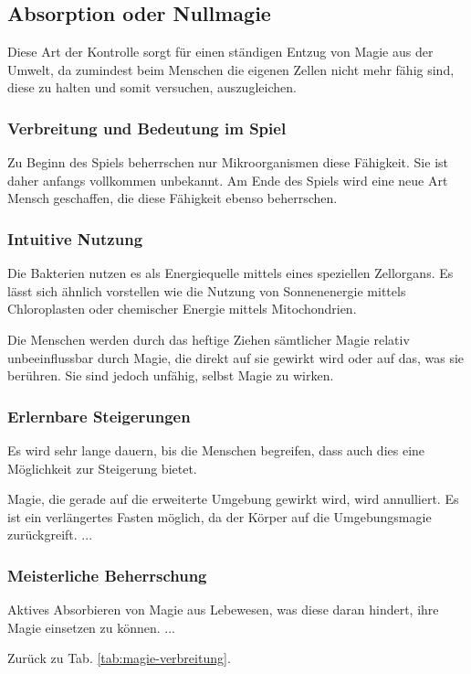 \subsection{Absorption oder Nullmagie}\label{sec:nullmagie}
Diese Art der Kontrolle sorgt für einen ständigen Entzug von Magie aus der Umwelt, da zumindest beim Menschen die eigenen Zellen nicht mehr fähig sind, diese zu halten und somit versuchen, auszugleichen. 

\subsubsection{Verbreitung und Bedeutung im Spiel}
Zu Beginn des Spiels beherrschen nur Mikroorganismen diese Fähigkeit. Sie ist daher anfangs vollkommen unbekannt. 
Am Ende des Spiels wird eine neue Art Mensch geschaffen, die diese Fähigkeit ebenso beherrschen.

\subsubsection{Intuitive Nutzung}
Die Bakterien nutzen es als Energiequelle mittels eines speziellen Zellorgans. 
Es lässt sich ähnlich vorstellen wie die Nutzung von Sonnenenergie mittels Chloroplasten oder chemischer Energie mittels Mitochondrien. 

Die Menschen werden durch das heftige Ziehen sämtlicher Magie relativ unbeeinflussbar durch Magie, die direkt auf sie gewirkt wird oder auf das, was sie berühren. 
Sie sind jedoch unfähig, selbst Magie zu wirken.

\subsubsection{Erlernbare Steigerungen}
Es wird sehr lange dauern, bis die Menschen begreifen, dass auch dies eine Möglichkeit zur Steigerung bietet.
\begin{outline}
	\1 Magie, die gerade auf die erweiterte Umgebung gewirkt wird, wird annulliert.
	\1 Es ist ein verlängertes Fasten möglich, da der Körper auf die Umgebungsmagie zurückgreift.
	\1 ...
\end{outline}

\subsubsection{Meisterliche Beherrschung} 
\begin{outline}
	\1 Aktives Absorbieren von Magie aus Lebewesen, was diese daran hindert, ihre Magie einsetzen zu können.
	\1 ...
\end{outline}
Zurück zu Tab. \ref{tab:magie-verbreitung}.



